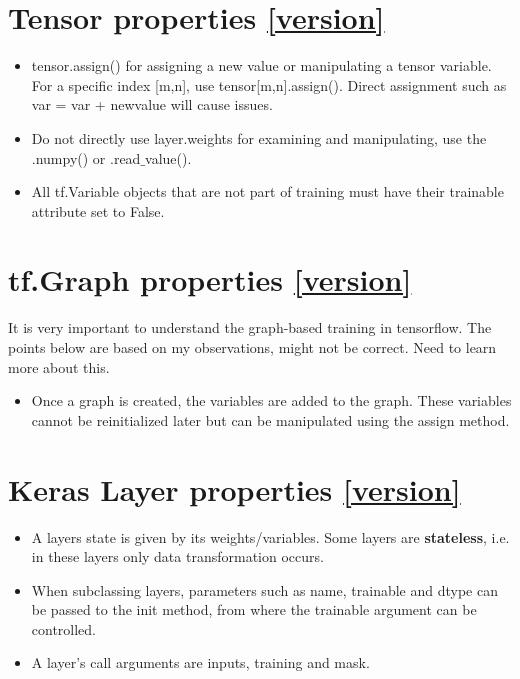 \documentclass[11pt]{article}
\begin{document}
\begin{multicols*}{2}
\section{Tensor properties  \autoref{version}}
\begin{itemize}

\item tensor.assign() for assigning a new value or manipulating a tensor variable. For a specific index [m,n], use tensor[m,n].assign(). Direct assignment such as var = var + newvalue will cause issues.
\item Do not directly use layer.weights for examining and manipulating, use the .numpy() or .read$\_$value().
\item All tf.Variable objects that are not part of training must have their trainable attribute set to False.
\end{itemize}

\section{tf.Graph properties  \autoref{version}}
It is very important to understand the graph-based training in tensorflow. The points below are based on my observations, might not be correct. Need to learn more about this.
\begin{itemize}
\item Once a graph is created, the variables are added to the graph. These variables cannot be reinitialized later but can be manipulated using the assign method.
\end{itemize}

\section{Keras Layer properties  \autoref{version}}
\begin{itemize}
\item A layers state is given by its weights/variables. Some layers are \textbf{stateless}, i.e. in these layers only data transformation occurs.
\item When subclassing layers, parameters such as name, trainable and dtype can be passed to the init method, from where the trainable argument can be controlled.
\item A layer's call arguments are inputs, training and mask.
\end{itemize}



\end{multicols*}
\end{document}
